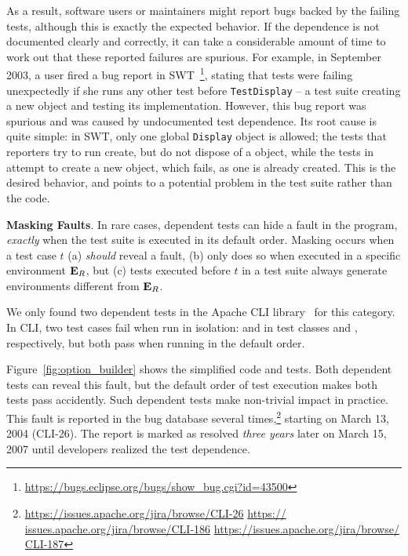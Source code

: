 As a result, software users or maintainers
might report bugs backed by the failing tests, although this
is exactly the expected behavior. 
If the dependence is not documented clearly and
correctly, it can take a considerable amount of time to work out that
these reported failures are spurious.
For example,
in September 2003, a user fired a
bug report in SWT~\cite{swt}\footnote{\url{https://bugs.eclipse.org/bugs/show_bug.cgi?id=43500}},
stating that tests were failing unexpectedly
if she runs any other test before \texttt{TestDisplay} --
a test suite creating a new  object and testing its
implementation. However, this bug report was spurious and was
caused by undocumented test dependence.
Its root cause is quite simple: in SWT, only one global \texttt{Display}
object is allowed; the tests that reporters try to run
create, but do not dispose of a  object, while
the tests in  attempt to create
a new  object, which fails, as one
is already created. This is the desired behavior,
and points to a potential problem in the test suite rather
than the code.

\vspace{1mm}

\noindent \textbf{Masking Faults}. In rare cases,
dependent tests can hide a fault in the
program, \emph{exactly} when the test suite is executed in its default
order. Masking occurs when a test case $t$ (a) \emph{should}
reveal a fault, (b) only does so when executed in a specific environment
$\mathbf{E}_R$, but (c) tests executed before $t$ in a test suite always
generate environments different from
$\mathbf{E}_R$.



We only found two dependent tests in
the Apache CLI library~\cite{cli} for this category.
In CLI, two test cases fail when run in isolation:
 and  in test
classes  and ,
respectively, but both pass when running in the default order.

Figure~\ref{fig:option_builder} shows the simplified code and
tests. Both dependent tests can reveal this fault,  but
the default order of test execution makes both tests pass
accidently. Such dependent tests
make non-trivial impact in practice.
This fault is reported in the bug
database several times,\footnote{\url{https://issues.apache.org/jira/browse/CLI-26} \url{https://
issues.apache.org/jira/browse/CLI-186} \url{https://issues.apache.org/jira/browse/
CLI-187}} starting on March 13, 2004 (CLI-26). The report is marked as resolved
\emph{three years} later on March 15, 2007 until developers
realized the test dependence.

